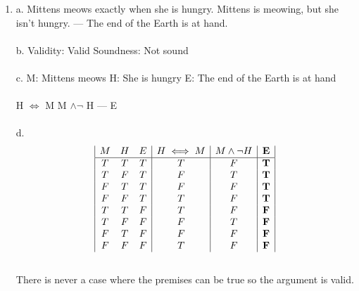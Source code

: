 \documentclass[]{article}
\begin{document}
\begin{enumerate}
    \item a.
    \newline Mittens meows exactly when she is hungry.
    \newline
    Mittens is meowing, but she isn't hungry.
    \newline
    ---
    \newline
    The end of the Earth is at hand.
    \\\\b.
    Validity: Valid
    \newline
    Soundness: Not sound
    \\\\c.
    \newline M: Mittens meows
    \newline H: She is hungry
    \newline E: The end of the Earth is at hand 
    \\\\ H $\iff$ M
    \newline M $\land \neg$ H
    \newline ---
    \newline E
    \\\\d.
    \begin{displaymath}
    \begin{array}{|c c c|c|c|c|}
    M & H & E & H \iff M & M \land \neg H & \textbf{E}\\ %
    \hline %
    T & T & T & T & F & \textbf{T}\\
    T & F & T & F & T & \textbf{T}\\
    F & T & T & F & F & \textbf{T}\\
    F & F & T & T & F & \textbf{T}\\
    T & T & F & T & F & \textbf{F}\\
    T & F & F & F & T & \textbf{F}\\
    F & T & F & F & F & \textbf{F}\\
    F & F & F & T & F & \textbf{F}\\
    \end{array}
    \end{displaymath}
    \\There is never a case where the premises can be true so the argument is valid.
    

\end{enumerate}
\end{document}
